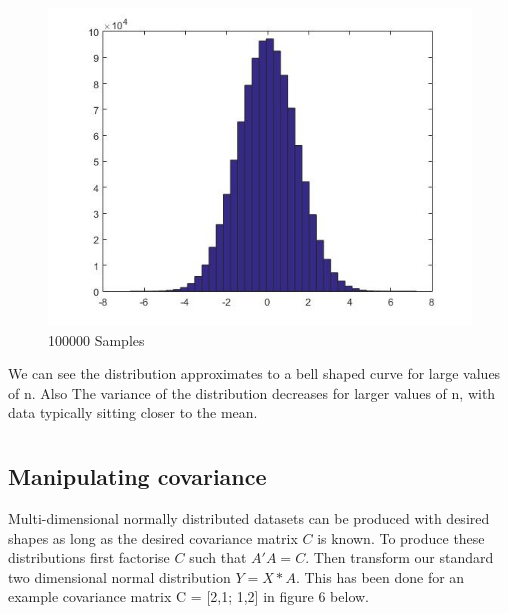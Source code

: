 \documentclass[10pt]{article}
\begin{document}
\begin{figure}[!h]
\begin{minipage}[b]{0.32\textwidth}
    \includegraphics[width=\textwidth]{clt100000.jpg}
    \caption{100000 Samples}
  \end{minipage}
\end{figure}

We can see the distribution approximates to a bell shaped curve for large values of n. Also The variance of the distribution decreases for larger values of n, with data typically sitting closer to the mean. 

\section{}
\subsection{Manipulating covariance}

Multi-dimensional normally distributed datasets can be produced with desired shapes as long as the desired covariance matrix $C$ is known. To produce these distributions first factorise $C$ such that $A'A = C$. Then transform our standard two dimensional normal distribution $Y = X*A$. This has been done for an example covariance matrix C = [2,1; 1,2] in figure 6 below. 
\end{document}
